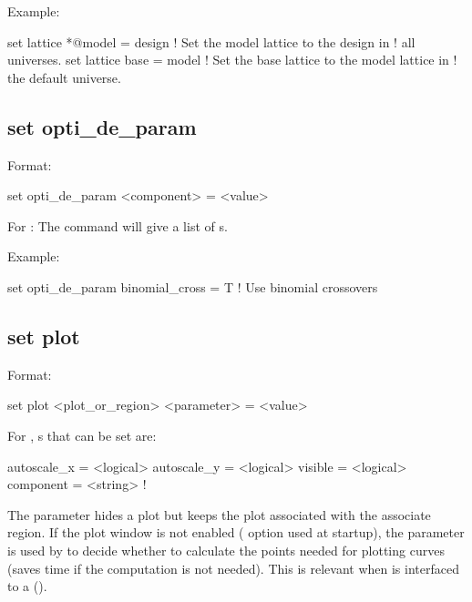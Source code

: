 {{Example:
\begin{example}
  set lattice *@model = design  ! Set the model lattice to the design in 
                                !   all universes.
  set lattice base = model      ! Set the base lattice to the model lattice in 
                                !   the default universe.
\end{example}


\subsection{set opti_de_param}
\label{s:set.opti.de.param}

Format:
\begin{example}
  set opti_de_param <component> = <value>
\end{example}

For : The  command will give a list of 
s.

Example:
\begin{example}
  set opti_de_param binomial_cross = T  ! Use binomial crossovers 
\end{example}


\subsection{set plot}
\label{s:set.plot}

Format:
\begin{example}
  set plot <plot_or_region> <parameter> = <value>
\end{example}

For , s that can be set are:
\begin{example}
  autoscale_x = <logical>
  autoscale_y = <logical>
  visible     = <logical>
  component   = <string>    ! 
\end{example}

The  parameter hides a plot but keeps the plot associated with the associate region. If
the plot window is not enabled ( option used at startup), the  parameter is
used by \tao to decide whether to calculate the points needed for plotting curves (saves time if the
computation is not needed). This is relevant when \tao is interfaced to a 
().

}}
